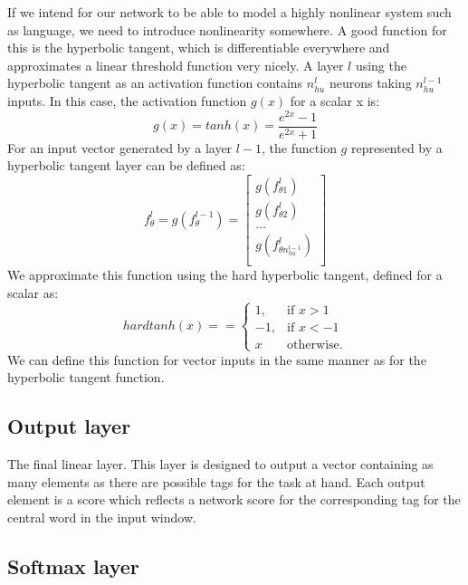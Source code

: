 If we intend for our network to be able to model a highly nonlinear
system such as language, we need to introduce nonlinearity
somewhere. A good function for this is the hyperbolic tangent, which
is differentiable everywhere and approximates a linear threshold
function very nicely. A layer $l$ using the hyperbolic tangent as an
activation function contains $n^l_{hu}$ neurons taking $n^{l-1}_{hu}$
inputs. In this case, the activation function $g(x)$ for a scalar x
is:
\begin{equation}
  g(x) = tanh(x) = \frac{e^{2x} - 1}{e^{2x} + 1}
\end{equation}
For an input vector generated by a layer $l - 1$, the function $g$ represented by a hyperbolic tangent layer can be defined as:
\begin{equation}
  f^l_{\theta} = g(f^{l-1}_{\theta})
  = \left[ \begin{array}{c}
      g(f^l_{\theta1}) \\
      g(f^l_{\theta2}) \\
      \ldots \\
      g(f^l_{\theta n^{l-1}_{hu}})\\ \end{array} \right]
\end{equation}
We approximate this function using the hard hyperbolic tangent, defined for a scalar as:
\begin{equation}
  hardtanh(x) = = \begin{cases} 1, & \mbox{if } x > 1 \\ -1, & \mbox{if } x < -1 \\ x & \mbox{otherwise.}\end{cases}
\end{equation}
We can define this function for vector inputs in the same manner
as for the hyperbolic tangent function.

\subsection{Output layer}

The final linear layer. This layer is designed to output a vector
containing as many elements as there are possible tags for the task at
hand.  Each output element is a score which reflects a network score
for the corresponding tag for the central word in the input window.

\subsection{Softmax layer}

